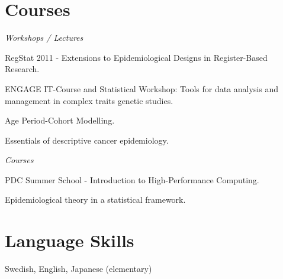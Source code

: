 %
%
\section{Courses}
\textit{Workshops / Lectures}
\begin{innerlist}
    \item RegStat 2011 - Extensions to Epidemiological Designs in Register-Based Research.
    \item ENGAGE IT-Course and Statistical Workshop: Tools for data analysis and management in complex traits genetic studies.
    \item Age Period-Cohort Modelling.
    \item Essentials of descriptive cancer epidemiology.
\end{innerlist}

\halfblankline

\textit{Courses}
\begin{innerlist}
    \item PDC Summer School - Introduction to High-Performance Computing.
    \item Epidemiological theory in a statistical framework.
\end{innerlist}


%
%
\section{Language Skills}
Swedish, English, Japanese (elementary)
